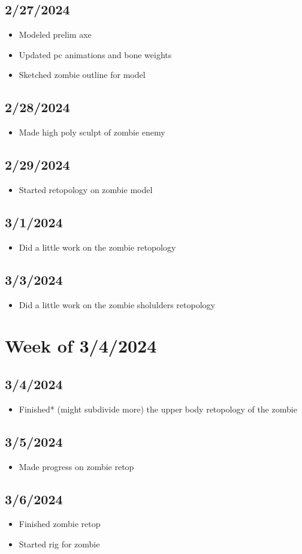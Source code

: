\documentclass{article}
\begin{document}
\subsection*{2/27/2024}
\begin{itemize}
   \item Modeled prelim axe
   \item Updated pc animations and bone weights
   \item Sketched zombie outline for model
\end{itemize}

\subsection*{2/28/2024}
\begin{itemize}
   \item Made high poly sculpt of zombie enemy
\end{itemize}

\subsection*{2/29/2024}
\begin{itemize}
   \item Started retopology on zombie model
\end{itemize}

\subsection*{3/1/2024}
\begin{itemize}
   \item Did a little work on the zombie retopology
\end{itemize}
\subsection*{3/3/2024}
\begin{itemize}
   \item Did a little work on the zombie sholulders retopology
\end{itemize}

\section*{Week of 3/4/2024}
\subsection*{3/4/2024}
\begin{itemize}
   \item Finished* (might subdivide more) the upper body retopology of the zombie
\end{itemize}

\subsection*{3/5/2024}
\begin{itemize}
   \item Made progress on zombie retop
\end{itemize}
\subsection*{3/6/2024}
\begin{itemize}
   \item Finished zombie retop
   \item Started rig for zombie
\end{itemize}
\end{document}
